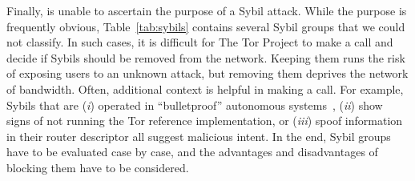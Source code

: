 Finally, \sys is unable to ascertain the purpose of a Sybil attack.  While the
purpose is frequently obvious, Table~\ref{tab:sybils} contains several Sybil
groups that we could not classify.  In such cases, it is difficult for The Tor
Project to make a call and decide if Sybils should be removed from the network.
Keeping them runs the risk of exposing users to an unknown attack, but removing
them deprives the network of bandwidth.  Often, additional context is helpful in
making a call.  For example, Sybils that are (\emph{i}) operated in
``bulletproof'' autonomous systems~\cite{Konte2015a}, (\emph{ii}) show signs of
not running the Tor reference implementation, or (\emph{iii}) spoof information
in their router descriptor all suggest malicious intent.  In the end, Sybil
groups have to be evaluated case by case, and the advantages and disadvantages
of blocking them have to be considered.
